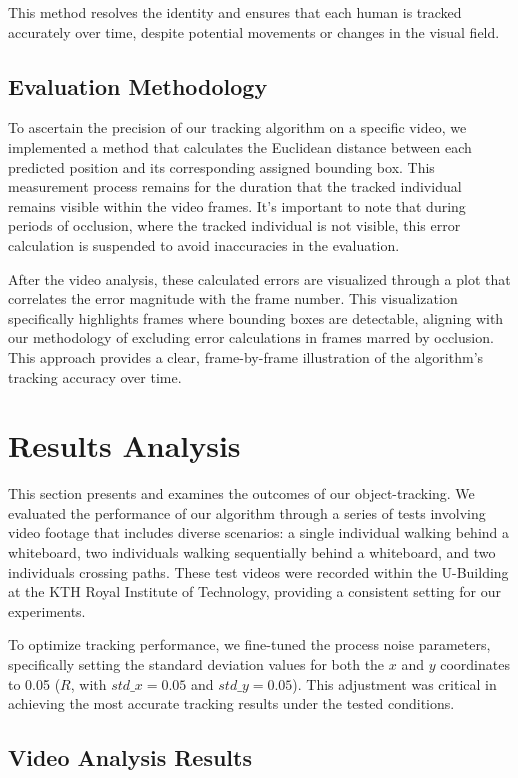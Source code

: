 \documentclass{article}
\begin{document}
This method resolves the identity and ensures that each human is tracked accurately over time, despite potential movements or changes in the visual field.



\subsection{Evaluation Methodology}
To ascertain the precision of our tracking algorithm on a specific video, we implemented a method that calculates the Euclidean distance between each predicted position and its corresponding assigned bounding box. This measurement process remains for the duration that the tracked individual remains visible within the video frames. It's important to note that during periods of occlusion, where the tracked individual is not visible, this error calculation is suspended to avoid inaccuracies in the evaluation.

After the video analysis, these calculated errors are visualized through a plot that correlates the error magnitude with the frame number. This visualization specifically highlights frames where bounding boxes are detectable, aligning with our methodology of excluding error calculations in frames marred by occlusion. This approach provides a clear, frame-by-frame illustration of the algorithm's tracking accuracy over time.

\section{Results Analysis}
This section presents and examines the outcomes of our object-tracking. We evaluated the performance of our algorithm through a series of tests involving video footage that includes diverse scenarios: a single individual walking behind a whiteboard, two individuals walking sequentially behind a whiteboard, and two individuals crossing paths. These test videos were recorded within the U-Building at the KTH Royal Institute of Technology, providing a consistent setting for our experiments.

To optimize tracking performance, we fine-tuned the process noise parameters, specifically setting the standard deviation values for both the \(x\) and \(y\) coordinates to 0.05 (\(R\), with \(std\_x = 0.05\) and \(std\_y = 0.05\)). This adjustment was critical in achieving the most accurate tracking results under the tested conditions.

\subsection{Video Analysis Results}
\end{document}
